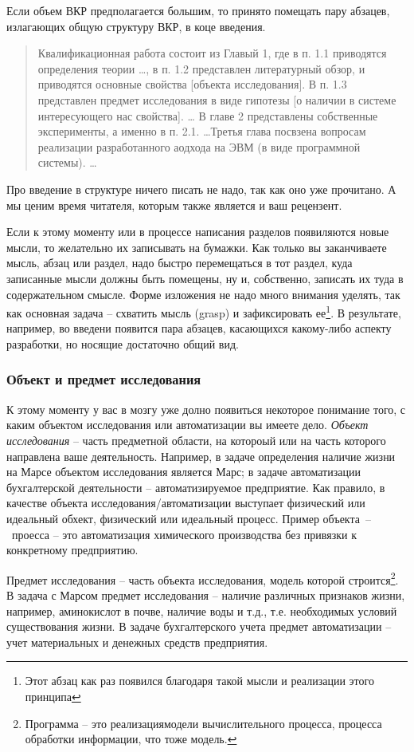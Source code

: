 \documentclass[a4paper,14pt,final]{extreport}
\begin{document}
Если объем ВКР предполагается большим, то принято помещать пару абзацев, излагающих общую структуру ВКР, в коце введения.

\begin{quote}
  Квалификационная работа состоит из Главый 1, где в п. 1.1 приводятся определения теории \ldots{}, в п. 1.2 представлен литературный обзор, и приводятся основные свойства [объекта исследования].  В п. 1.3 представлен предмет исследования в виде гипотезы [о наличии в системе интересующего нас свойства].  \ldots{} В главе 2 представлены собственные эксперименты, а именно в п. 2.1. \ldots Третья глава посвзена вопросам реализации разработанного аодхода на ЭВМ (в виде программной системы).  \ldots{}
 \end{quote}
Про введение в структуре ничего писать не надо, так как оно уже прочитано.  А мы ценим время читателя, которым также является и ваш рецензент.

Если к этому моменту или в процессе написания разделов появиляются новые мысли, то желательно их записывать на бумажки.  Как только вы заканчиваете мысль, абзац или раздел, надо быстро перемещаться в тот раздел, куда записанные мысли должны быть помещены, ну и, собственно, записать их туда в содержательном смысле.  Форме изложения не надо много внимания уделять, так как основная задача -- схватить мысль (grasp) и зафиксировать ее\footnote{Этот абзац как раз появился благодаря такой мысли и реализации этого принципа}.  В результате, например, во введени появится пара абзацев, касающихся какому-либо аспекту разработки, но носящие достаточно общий вид.

\subsubsection{Объект и предмет исследования}
К этому моменту у вас в мозгу уже долно появиться некоторое понимание того, с каким объектом исследования или автоматизации вы имеете дело.  \emph{Объект исследования} -- часть предметной области, на котороый или на часть которого направлена ваше деятельность.  Например, в задаче определения наличие жизни на Марсе объектом исследования является Марс; в задаче автоматизации бухгалтерской деятельности -- автоматизируемое предприятие.  Как правило, в качестве объекта исследования/автоматизации выступает физический или идеальный обхект, физический или идеальный процесс.  Пример объекта~--~проесса -- это автоматизация химического производства без привязки к конкретному предприятию.

Предмет исследования -- часть объекта исследования, модель которой строится\footnote{Программа -- это реализациямодели вычислительного процесса, процесса обработки информации, что тоже модель.}.  В задача с Марсом предмет исследования -- наличие различных признаков жизни, например, аминокислот в почве, наличие воды и т.д., т.е. необходимых условий существования жизни.  В задаче бухгалтерского учета предмет автоматизации -- учет материальных и денежных средств предприятия.
\end{document}
